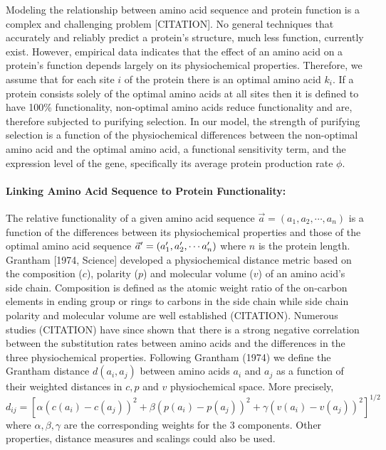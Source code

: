 Modeling the relationship between amino acid sequence and protein function is a complex and challenging problem [CITATION].
No general techniques that accurately and reliably predict a protein's structure, much less function, currently exist.
However, empirical data indicates that the effect of an amino acid on a protein's function depends largely on its physiochemical properties.
Therefore, we assume that for each site $i$ of the protein there is an optimal amino acid $k_i$.
If a protein consists solely of the optimal amino acids at all sites then it is defined to have 100\% functionality, non-optimal amino acids reduce functionality and are, therefore subjected to purifying selection.
In our model, the strength of purifying selection is a function of the physiochemical differences between the non-optimal amino acid and the optimal amino acid, a functional sensitivity term, and the expression level of the gene, specifically its average protein production rate $\phi$.


\paragraph*{Linking Amino Acid Sequence to  Protein Functionality:}
The relative functionality of a given amino acid sequence $\vec{a} = (a_1, a_2, \cdots, a_n)$  is a function of the differences between its physiochemical properties and those of the optimal amino acid sequence $\vec{a}^\prime = (a^\prime_1, a^\prime_2, \cdots a^\prime_n)$ where $n$ is the protein length. 
Grantham [1974, Science] developed a physiochemical distance metric based on the composition ($c$), polarity ($p$) and molecular volume ($v$) of an amino acid's side chain. 
Composition is defined as the atomic weight ratio of the on-carbon elements in ending group or rings to carbons in the side chain while side chain polarity and molecular volume are well established (CITATION). 
Numerous studies (CITATION) have since shown that there is a strong negative correlation between the substitution rates between amino acids and the differences in the three physiochemical properties. 
Following Grantham (1974) we define the Grantham distance $d(a_i, a_j)$ between amino acids $a_i$ and $a_j$ as a function of their weighted distances in $c, p$ and $v$ physiochemical space.
More precisely, $d_{ij} = [\alpha (c(a_i)-c(a_j))^2 + \beta (p(a_i) - p(a_j))^2 + \gamma (v(a_i) - v(a_j))^2]^{1/2}$ where $\alpha, \beta, \gamma$ are the corresponding weights for the 3 components. 
Other properties, distance measures and scalings could also be used.


